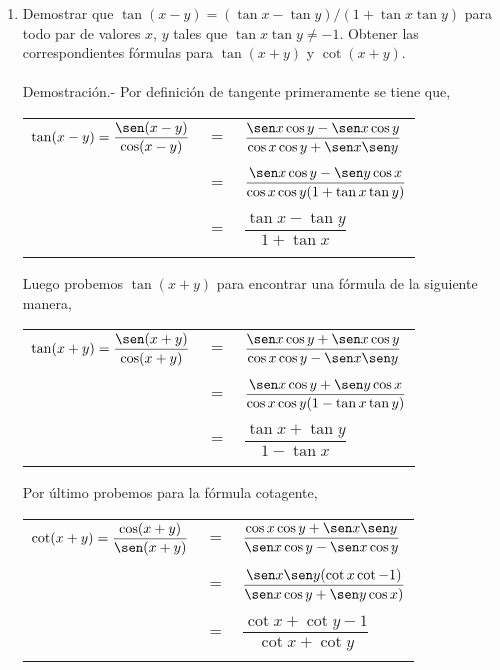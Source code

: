 \begin{enumerate}[\bfseries 1.]
\item Demostrar que $\tan(x-y)=(\tan x-\tan y)/(1+\tan x\tan y)$ para todo par de valores $x$, $y$ tales que $\tan x \tan y \neq -1$. Obtener las correspondientes fórmulas para $\tan(x+y)$ y $\cot(x+y)$.\\\\
    Demostración.-\; Por definición de tangente primeramente se tiene que, 
    \begin{center}
	\begin{tabular}{rcl}
	    $\tan(x-y)=\dfrac{\sen(x-y)}{\cos(x-y)}$&$=$&$\dfrac{\sen x \cos y - \sen x \cos y}{\cos x \cos y + \sen x \sen y}$\\\\
	    &$=$&$\dfrac{\sen x \cos y - \sen y \cos x}{\cos x \cos y(1+\tan x \tan y)}$\\\\
	    &$=$&$\dfrac{\tan x- \tan y}{1 + \tan x}$\\\\
	\end{tabular}
    \end{center}
    Luego probemos $\tan (x+y)$ para encontrar una fórmula de la siguiente manera,
    \begin{center}
	\begin{tabular}{rcl}
	    $\tan(x+y)=\dfrac{\sen(x+y)}{\cos(x+y)}$&$=$&$\dfrac{\sen x \cos y + \sen x \cos y}{\cos x \cos y - \sen x \sen y}$\\\\
	    &$=$&$\dfrac{\sen x \cos y + \sen y \cos x}{\cos x \cos y(1-\tan x \tan y)}$\\\\
	    &$=$&$\dfrac{\tan x + \tan y}{1 - \tan x}$\\\\
	\end{tabular}
    \end{center}
    Por último probemos para la fórmula cotagente,
    \begin{center}
	\begin{tabular}{rcl}
	    $\cot(x+y)=\dfrac{\cos(x+y)}{\sen(x+y)}$&$=$&$\dfrac{\cos x \cos y + \sen x \sen y}{\sen x \cos y - \sen x \cos y}$\\\\
	    &$=$&$\dfrac{\sen x \sen y (\cot x \cot - 1)}{\sen x \cos y + \sen y \cos x)}$\\\\
	    &$=$&$\dfrac{\cot x + \cot y - 1}{\cot x + \cot y}$\\\\
	\end{tabular}
    \end{center}


\end{enumerate}
